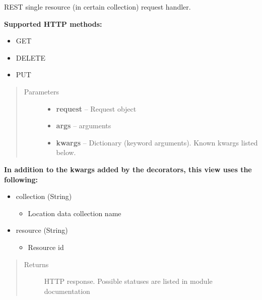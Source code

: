 \documentclass[letterpaper,10pt,english]{sphinxmanual}
\begin{document}
\begin{fulllineitems}
\label{codedoc/locdoc:lbd_backend.LBD_REST_locationdata.views.single_resource}
REST single resource (in certain collection) request handler.

\textbf{Supported HTTP methods:}
\begin{itemize}
\item {} 
GET

\item {} 
DELETE

\item {} 
PUT

\end{itemize}
\begin{quote}\begin{description}
\item[{Parameters}] \leavevmode\begin{itemize}
\item {} 
\textbf{request} -- Request object

\item {} 
\textbf{args} -- arguments

\item {} 
\textbf{kwargs} -- Dictionary (keyword arguments). Known kwargs listed below.

\end{itemize}

\end{description}\end{quote}

\textbf{In addition to the kwargs added by the decorators, this view uses the following:}
\begin{itemize}
\item {} 
collection (String)
\begin{itemize}
\item {} 
Location data collection name

\end{itemize}

\item {} 
resource (String)
\begin{itemize}
\item {} 
Resource id

\end{itemize}

\end{itemize}
\begin{quote}\begin{description}
\item[{Returns}] \leavevmode
HTTP response. Possible statuses are listed in module documentation

\end{description}\end{quote}

\end{fulllineitems}
\end{document}
